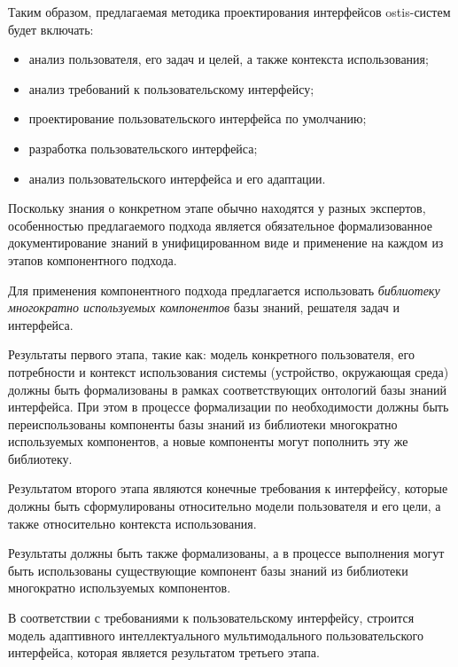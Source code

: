 Таким образом, предлагаемая методика проектирования интерфейсов ostis-систем будет включать:
\begin{itemize}
\item анализ пользователя, его задач и целей, а также контекста использования;
\item анализ требований к пользовательскому интерфейсу;
\item проектирование пользовательского интерфейса по умолчанию;
\item разработка пользовательского интерфейса;
\item анализ пользовательского интерфейса и его адаптации.
\end{itemize}

Поскольку знания о конкретном этапе обычно находятся у разных экспертов, особенностью предлагаемого подхода является обязательное формализованное документирование знаний в унифицированном виде и применение на каждом из этапов компонентного подхода.

Для применения компонентного подхода предлагается использовать \textit{библиотеку многократно используемых компонентов} базы знаний, решателя задач и интерфейса.


Результаты первого этапа, такие как: модель конкретного пользователя, его потребности и контекст использования системы (устройство, окружающая среда) должны быть формализованы в рамках соответствующих онтологий базы знаний интерфейса. 
При этом в процессе формализации по необходимости должны быть переиспользованы компоненты базы знаний из библиотеки многократно используемых компонентов, а новые компоненты могут пополнить эту же библиотеку.


Результатом второго этапа являются конечные требования к интерфейсу, которые должны быть сформулированы относительно модели пользователя и его цели, а также относительно контекста использования.

Результаты должны быть также формализованы, а в процессе выполнения могут быть использованы существующие компонент базы знаний из библиотеки многократно используемых компонентов.


В соответствии с требованиями к пользовательскому интерфейсу, строится модель адаптивного интеллектуального мультимодального пользовательского интерфейса, которая является результатом третьего этапа.

